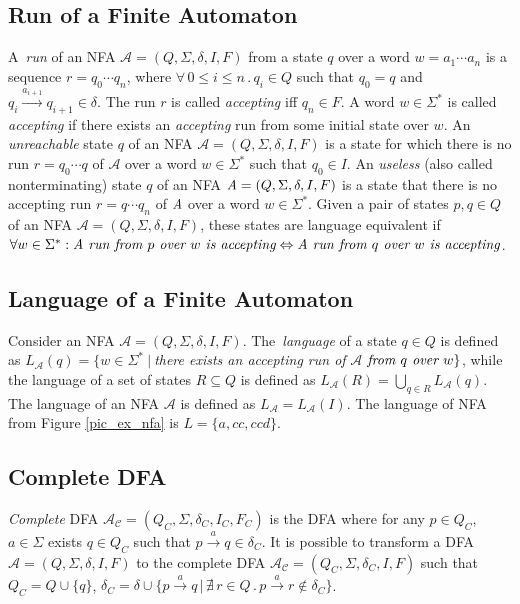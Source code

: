 	\subsection{Run of a Finite Automaton}
	\label{defRun}
  A~\emph{run} of an NFA $\mathcal{A}=(Q,\Sigma,\delta,I,F)$ from a state $q$
  over a word $w=a_1\cdots a_n$ is a sequence $r = q_0 \cdots q_n$, where $\forall\,0\leq i \leq n\,.\,q_i\in Q$ 
  such that $q_0=q$ and $q_i\xrightarrow{a_{i+1}}q_{i+1}\in \delta$. 
  The run $r$ is called \emph{accepting} iff $q_n \in F$. 
	A word $w \in \Sigma^{*}$ is called \emph{accepting} if there exists an \emph{accepting} run from some initial state over $w$.
  An \emph{unreachable} state $q$ of an NFA $\mathcal{A}=(Q,\Sigma,\delta,I,F)$ is a state for which there is no run $r=q_0\cdots q$ of 
  $\mathcal{A}$ over a word $w \in \Sigma^{*}$ such that $q_0\in I$.
  An \emph{useless} (also called nonterminating) state $q$ of an NFA $\emph{A}=(Q,\Sigma,\delta,I,F)$ is a state that there is no accepting run $r=q\cdots q_n$ 
  of $\emph{A}$ over a word $w \in \Sigma^{*}$.
  Given a pair of states $p,q\in Q$ of an NFA $\mathcal{A}=(Q,\Sigma,\delta,I,F)$, these states are language equivalent if 
  $\forall w \in \Sigma^{*}: \emph{A run from } p \emph{ over } w \emph{ is accepting} \Leftrightarrow 
			\emph{A run from } q \emph{ over } w \emph{ is accepting}$.


  \subsection{Language of a Finite Automaton}
  Consider an NFA $\mathcal{A}=(Q,\Sigma,\delta,I,F)$.
  The~\emph{language} of a state $q \in Q$ is defined as 
  $L_\mathcal{A}(q) = \{w\in \Sigma^{*}\ |\ $\emph{there exists an accepting run of }$
  \mathcal{A}$$ 
  \emph{ from }q\emph{ over }w\}$, while the language of a set of states $R\subseteq Q$ is defined as $L_{\mathcal{A}}(R)=\bigcup_{q\in R}L_{\mathcal{A}}(q)$.
  The language of an NFA $\mathcal{A}$ is defined as $L_{\mathcal{A}}=L_{\mathcal{A}}(I)$.
  The language of NFA from Figure \ref{pic_ex_nfa} is $L=\{a,cc,ccd\}$.

  \subsection{Complete DFA}
  \label{defCompleteDFA}
  \emph{Complete} DFA $\mathcal{A_C}=(Q_C,\Sigma,\delta_C,I_C,F_C)$ is the DFA where 
  for any $p\in Q_C$, $a\in \Sigma$ exists $q\in Q_C$ such that  $p\xrightarrow{a}q\in\delta_C$. 
  It is possible to transform a DFA $\mathcal{A}=(Q,\Sigma,\delta,I,F)$ to the complete DFA $\mathcal{A_C}=(Q_C,\Sigma,\delta_C,I,F)$ such that $Q_C=Q\cup\{q\}$, 
  $\delta_C = \delta \cup \{p\xrightarrow{a}q\,|\,\nexists\, r \in Q\,.\,p\xrightarrow{a}r\not\in\delta_C\}$.

